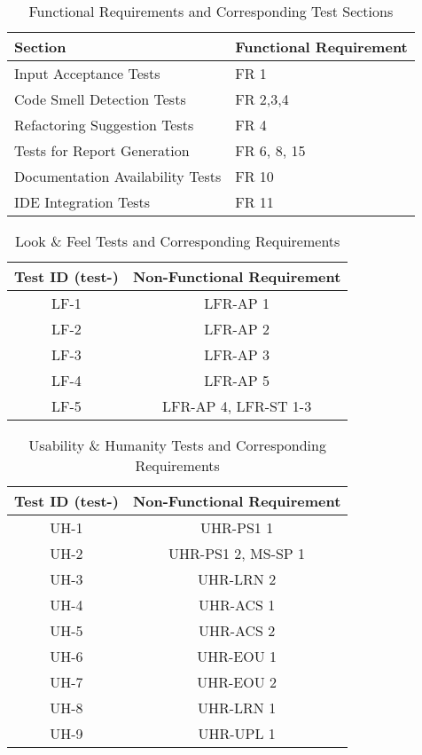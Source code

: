 \documentclass[12pt, titlepage]{article}
\begin{document}
  \begin{table}[H]
    \centering
    \caption{Functional Requirements and Corresponding Test Sections}
    \begin{tabular}{|p{}|p{}|}
      \toprule \textbf{Section} & \textbf{Functional Requirement} \\

      \midrule
      Input Acceptance Tests & FR 1 \\ \hline
      Code Smell Detection Tests & FR 2,3,4 \\ \hline
      Refactoring Suggestion Tests & FR 4 \\ \hline
      Tests for Report Generation & FR 6, 8, 15 \\ \hline
      Documentation Availability Tests & FR 10 \\ \hline
      IDE Integration Tests & FR 11 \\
      \bottomrule
    \end{tabular}
    \label{tab:sections_requirements}
  \end{table}

  \label{tab:nfr-trace-reqs}
  \begin{table}[H]
    \centering
    \caption{Look \& Feel Tests and Corresponding Requirements}
    \begin{tabular}{|c|c|}
      \toprule \textbf{Test ID (test-)} & \textbf{Non-Functional Requirement} \\
      \midrule
      LF-1 & LFR-AP 1 \\
      LF-2 & LFR-AP 2 \\
      LF-3 & LFR-AP 3 \\
      LF-4 & LFR-AP 5 \\
      LF-5 & LFR-AP 4, LFR-ST 1-3 \\
      \bottomrule
    \end{tabular}
  \end{table}

  \begin{table}[H]
    \centering
    \caption{Usability \& Humanity Tests and Corresponding Requirements}
    \begin{tabular}{|c|c|}
      \toprule \textbf{Test ID (test-)} & \textbf{Non-Functional Requirement} \\
      \midrule
      UH-1 & UHR-PS1 1 \\
      UH-2 & UHR-PS1 2, MS-SP 1 \\
      UH-3 & UHR-LRN 2 \\
      UH-4 & UHR-ACS 1 \\
      UH-5 & UHR-ACS 2 \\
      UH-6 & UHR-EOU 1 \\
      UH-7 & UHR-EOU 2 \\
      UH-8 & UHR-LRN 1 \\
      UH-9 & UHR-UPL 1 \\
      \bottomrule
    \end{tabular}
  \end{table}
\end{document}
